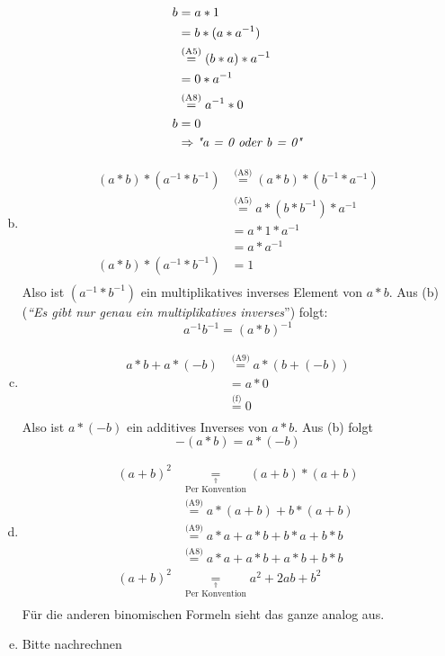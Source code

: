 \documentclass{article}
\begin{document}
\begin{enumerate}[(a)]
\begin{minipage}[t]{.4\textwidth}
    \begin{align*}
      b &= a * 1 \\
        &= b * (a * a^{-1}) \\
        &\overset{\text{(A5)}}= (b * a) * a^{-1} \\
        &= 0 * a^{-1} \\
        &\overset{\text{(A8)}}= a^{-1} * 0 \\
      b &= 0 \\
        &\Rightarrow \text{\emph{"a = 0 oder b = 0"}}
    \end{align*}
  \end{minipage}
\item
  \begin{align*}
    (a * b) * (a^{-1} * b^{-1}) &\overset{\text{(A8)}}= (a * b) * (b^{-1} * a^{-1}) \\
                                &\overset{\text{(A5)}}= a * (b * b^{-1}) * a^{-1} \\
                                &= a * 1 * a^{-1} \\
                                &= a * a^{-1} \\
    (a * b) * (a^{-1} * b^{-1})  &= 1\\
  \end{align*}
  Also ist $(a^{-1} * b^{-1})$ ein multiplikatives inverses Element von $a * b$.
  Aus (b) (\emph{``Es gibt nur genau ein multiplikatives inverses}'') folgt:
  \[
    a^{-1} b^{-1} = (a * b)^{-1}
  \]
\item
  \begin{align*}
    a * b + a * (-b) &\overset{\text{(A9)}}= a * (b + (-b)) \\
                     &= a * 0 \\
                     &\overset{\text{(f)}}= 0 \\
  \end{align*}
  Also ist $a * (-b)$ ein additives Inverses von $a * b$.
  Aus (b) folgt
  \[
    -(a * b) = a * (-b)
  \]
\item
  \begin{align*}
    (a + b)^2 &\underset{\overset{\Uparrow}{\text{Per Konvention}}}= (a + b) * (a + b) \\
              &\overset{\text{(A9)}}= a * (a + b) + b * (a + b) \\
              &\overset{\text{(A9)}}= a * a + a * b + b * a + b * b \\
              &\overset{\text{(A8)}}= a * a + a * b + a * b + b * b \\
    (a + b)^2 &\underset{\overset{\Uparrow}{\text{Per Konvention}}}= a^2 + 2ab + b^2 \\    
  \end{align*}
  Für die anderen binomischen Formeln sieht das ganze analog aus.
\item Bitte nachrechnen
\end{enumerate}
\end{document}
